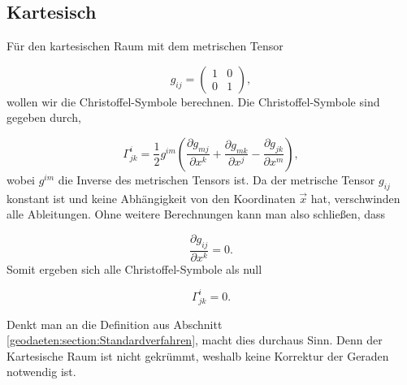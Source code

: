 %
%
%
%
\subsection{Kartesisch\label{geodaeten:section:Standardverfahren:Kartesisch}}

Für den kartesischen Raum mit dem metrischen Tensor
 
\begin{equation}
g_{ij} = \begin{pmatrix} 
	1 & 0 \\ 
	0 & 1 
\end{pmatrix},
\end{equation}
wollen wir die Christoffel-Symbole berechnen.
Die Christoffel-Symbole sind gegeben durch,

\begin{equation}
\Gamma^i_{jk} = \frac{1}{2} g^{im} \left( \frac{\partial g_{mj}}{\partial x^k} + \frac{\partial g_{mk}}{\partial x^j} - \frac{\partial g_{jk}}{\partial x^m} \right),
\end{equation}
wobei $g^{im}$ die Inverse des metrischen Tensors ist.
Da der metrische Tensor $g_{ij}$ konstant ist und keine Abhängigkeit von den Koordinaten $\vec{x}$ hat, verschwinden alle Ableitungen.
Ohne weitere Berechnungen kann man also schließen, dass

\begin{equation}
\frac{\partial g_{ij}}{\partial x^k} = 0 .
\end{equation}
Somit ergeben sich alle Christoffel-Symbole als null

\begin{equation}
\Gamma^i_{jk} = 0 .
\end{equation}

Denkt man an die Definition aus Abschnitt \ref{geodaeten:section:Standardverfahren}, macht dies durchaus Sinn.
Denn der Kartesische Raum ist nicht gekrümmt, weshalb keine Korrektur der Geraden notwendig ist.

